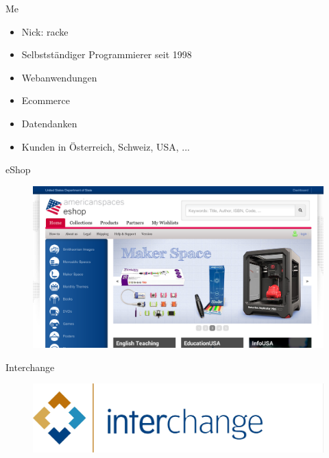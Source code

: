 

\begin{frame}{Me}
\begin{itemize}
\item Nick: racke
\item Selbstständiger Programmierer seit 1998
\item Webanwendungen
\item Ecommerce
\item Datendanken
\item Kunden in Österreich, Schweiz, USA, ...
\end{itemize}
\end{frame}


\begin{frame}{eShop}
\begin{figure}[!ht]
\centering
\includegraphics[width=1\linewidth]{img/eshop.png}
\end{figure}
\end{frame}

\begin{frame}{Interchange}
\begin{figure}[!ht]
\centering
\includegraphics[width=1\linewidth]{img/interchange.jpg}
\end{figure}
\end{frame}

